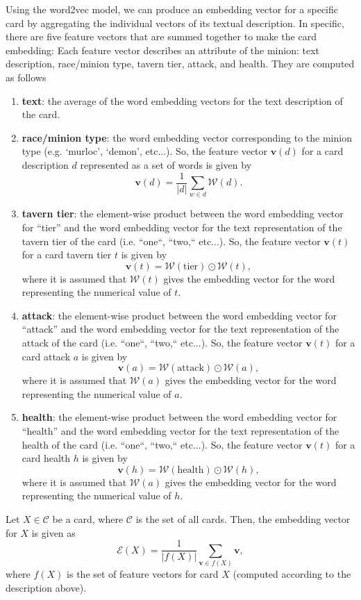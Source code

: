\documentclass{paper}
\let\vec\mathbf
\begin{document}
Using the word2vec model, we can produce an embedding vector for a specific card by aggregating the individual vectors of its textual description. In specific, there are five feature vectors that are summed together to make the card embedding: Each feature vector describes an attribute of the minion: text description, race/minion type, tavern tier, attack, and health. They are computed as follows
\begin{enumerate}
    \item \textbf{text}: the average of the word embedding vectors for the text description of the card.
    \item \textbf{race/minion type}: the word embedding vector corresponding to the minion type (e.g. `murloc', `demon', etc...). So, the feature vector $\vec{v}(d)$ for a card description $d$ represented as a set of words is given by $$\displaystyle\vec{v}(d)=\frac{1}{|d|}\sum_{w\in d}\mathcal{W}(d).$$
    \item \textbf{tavern tier}: the element-wise product between the word embedding vector for ``tier'' and the word embedding vector for the text representation of the tavern tier of the card (i.e. ``one``, ``two,`` etc...). So, the feature vector $\vec{v}(t)$ for a card tavern tier $t$ is given by $$\displaystyle\vec{v}(t)=\mathcal{W}(\text{tier}) \odot \mathcal{W}(t),$$ where it is assumed that $\mathcal{W}(t)$ gives the embedding vector for the word representing the numerical value of $t$.
    
    \item \textbf{attack}: the element-wise product between the word embedding vector for ``attack'' and the word embedding vector for the text representation of the attack of the card (i.e. ``one``, ``two,`` etc...). So, the feature vector $\vec{v}(t)$ for a card attack $a$ is given by $$\displaystyle\vec{v}(a)=\mathcal{W}(\text{attack}) \odot \mathcal{W}(a),$$ where it is assumed that $\mathcal{W}(a)$ gives the embedding vector for the word representing the numerical value of $a$.
    
    \item \textbf{health}: the element-wise product between the word embedding vector for ``health'' and the word embedding vector for the text representation of the health of the card (i.e. ``one``, ``two,`` etc...). So, the feature vector $\vec{v}(t)$ for a card health $h$ is given by $$\displaystyle\vec{v}(h)=\mathcal{W}(\text{health}) \odot \mathcal{W}(h),$$ where it is assumed that $\mathcal{W}(a)$ gives the embedding vector for the word representing the numerical value of $h$.
    
\end{enumerate}
Let $X\in\mathcal{C}$ be a card, where $\mathcal{C}$ is the set of all cards. Then, the embedding vector for $X$ is given as
\begin{equation*}
    \mathcal{E}(X)=\frac{1}{|f(X)|}\sum_{\vec{v}\in{f}(X)}\vec{v},
\end{equation*}
where $f(X)$ is the set of feature vectors for card $X$ (computed according to the description above).
\end{document}
